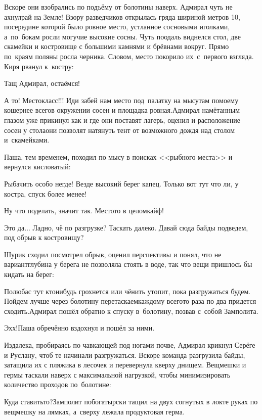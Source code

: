 Вскоре они взобрались по подъёму от болотины наверх. Адмирал чуть не ахнул\mdash рай на Земле! Взору разведчиков открылась гряда шириной метров 10, посередине которой было ровное место, устланное сосновыми иголками, а~по~бокам росли могучие высокие сосны. Чуть поодаль виднелся стол, две скамейки и костровище с большими камнями и брёвнами вокруг. Прямо по~краям поляны росла черника. Словом, место покорило их~с~первого взгляда. Киря рванул к~костру:

\diagdash Тащ Адмирал, остаёмся!

\diagdash А то! Место\mdash класс!!! Иди забей нам место под~палатку на мысу\mdash там по\sdash моему кошернее всего\mdash в окружении сосен и площадка ровная.\mdash Адмирал намётанным глазом уже прикинул как и где они поставят лагерь, оценил и расположение сосен у стола\mdash они позволят натянуть тент от возможного дождя над столом и~скамейками. 

Паша, тем временем, походил по мысу в поисках <<рыбного места>> и вернулся кисловатый:

\diagdash Рыбачить особо негде! Везде высокий берег капец. Только вот тут что ли, у костра, спуск более менее!

\diagdash Ну что поделать, значит так. Место\sdash то в целом\mdash кайф!

\diagdash Это да$\ldots$ Ладно, чё по разгрузке? Таскать далеко. Давай сюда байды подведем, под обрыв к костровищу? 

Шурик сходил посмотрел обрыв, оценил перспективы и понял, что не вариант\mdash глубина у берега не позволяла стоять в воде, так что вещи пришлось бы кидать на берег:

\diagdash Полюбас тут кто\sdash нибудь грохнется или чё\sdash нить утопит, пока разгружаться будем. Пойдем лучше через болотину перетаскаем\mdash каждому всего\sdash то раза по два придется сходить.\mdash Адмирал пошёл обратно к спуску в~болотину, позвав с~собой Замполита.

\diagdash Эх\sdash х!\mdash Паша обречённо вздохнул и пошёл за ними.

Издалека, пробираясь по чавкающей под ногами почве, Адмирал крикнул Серёге и Руслану, чтоб те начинали разгружаться. Вскоре команда разгрузила байды, затащила их с пляжика в лесочек и перевернула кверху днищем. Вещмешки и гермы таскали наверх с максимальной нагрузкой, чтобы минимизировать количество проходов по~болотине: 

\diagdash Куда ставить\sdash то?\mdash Замполит по\sdash богатырски тащил на двух согнутых в локте руках по вещмешку на лямках, а~сверху лежала продуктовая герма.

